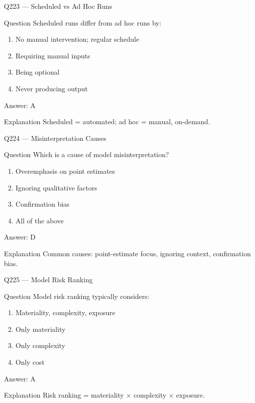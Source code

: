 \documentclass[aspectratio=169,8pt]{beamer}
\begin{document}
\begin{frame}{Q223 --- Scheduled vs Ad Hoc Runs}
\begin{block}{Question}
Scheduled runs differ from ad hoc runs by:
\begin{enumerate}
\item No manual intervention; regular schedule
\item Requiring manual inputs
\item Being optional
\item Never producing output
\end{enumerate}
\end{block}
\begin{exampleblock}{Answer: A}\end{exampleblock}
\begin{block}{Explanation}
Scheduled = automated; ad hoc = manual, on-demand.
\end{block}
\end{frame}

\begin{frame}{Q224 --- Misinterpretation Causes}
\begin{block}{Question}
Which is a cause of model misinterpretation?
\begin{enumerate}
\item Overemphasis on point estimates
\item Ignoring qualitative factors
\item Confirmation bias
\item All of the above
\end{enumerate}
\end{block}
\begin{exampleblock}{Answer: D}\end{exampleblock}
\begin{block}{Explanation}
Common causes: point-estimate focus, ignoring context, confirmation bias.
\end{block}
\end{frame}

\begin{frame}{Q225 --- Model Risk Ranking}
\begin{block}{Question}
Model risk ranking typically considers:
\begin{enumerate}
\item Materiality, complexity, exposure
\item Only materiality
\item Only complexity
\item Only cost
\end{enumerate}
\end{block}
\begin{exampleblock}{Answer: A}\end{exampleblock}
\begin{block}{Explanation}
Risk ranking = materiality × complexity × exposure.
\end{block}
\end{frame}
\end{document}
